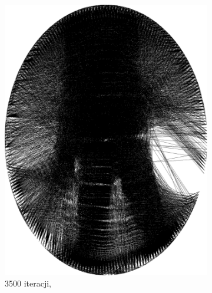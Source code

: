 \begin{figure}[htb]
\begin{subfigure}{0.19\textwidth}
            \includegraphics[width = \textwidth]{img/2-theory/aldrin/030mask-aldrin_ellipse_3500_threaded.png}
            \caption{3500 iteracji, }
            \label{theory-technics-mask-aldrin-threaded-o}
        \end{subfigure}
        \begin{subfigure}{0.19\textwidth}
            \centering

\end{subfigure}
\end{figure}
